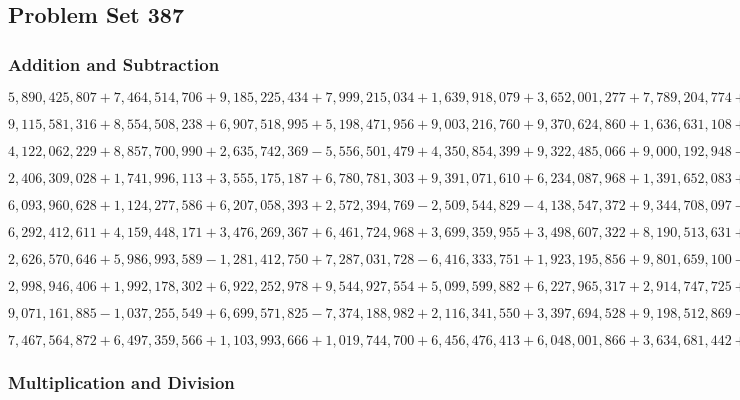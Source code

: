 \hypertarget{problem-set-387}{%
\subsection{Problem Set 387}\label{problem-set-387}}

\hypertarget{addition-and-subtraction}{%
\subsubsection{Addition and
Subtraction}\label{addition-and-subtraction}}

\(5,890,425,807+7,464,514,706+9,185,225,434+7,999,215,034+1,639,918,079+3,652,001,277+7,789,204,774+9,695,231,254+2,620,118,195+4,908,515,141\)

\(9,115,581,316+8,554,508,238+6,907,518,995+5,198,471,956+9,003,216,760+9,370,624,860+1,636,631,108+9,641,948,163+5,499,039,078+2,688,771,220\)

\(4,122,062,229+8,857,700,990+2,635,742,369-5,556,501,479+4,350,854,399+9,322,485,066+9,000,192,948-9,388,224,393 -8,062,983,947-8,305,356,834\)

\(2,406,309,028+1,741,996,113+3,555,175,187+6,780,781,303+9,391,071,610+6,234,087,968+1,391,652,083+7,830,080,796+9,226,144,130+8,742,749,566\)

\(6,093,960,628+1,124,277,586+6,207,058,393+2,572,394,769-2,509,544,829-4,138,547,372+9,344,708,097-5,394,869,096+4,791,799,950-6,793,711,068\)

\(6,292,412,611+4,159,448,171+3,476,269,367+6,461,724,968+3,699,359,955+3,498,607,322+8,190,513,631+7,003,806,438+1,498,062,871+2,874,485,378\)

\(2,626,570,646+5,986,993,589-1,281,412,750+7,287,031,728-6,416,333,751+1,923,195,856+9,801,659,100-4,299,319,586-7,025,338,873+6,664,325,830\)

\(2,998,946,406+1,992,178,302+6,922,252,978+9,544,927,554+5,099,599,882+6,227,965,317+2,914,747,725+2,492,681,261+8,435,369,210+1,552,564,041\)

\(9,071,161,885-1,037,255,549+6,699,571,825-7,374,188,982+2,116,341,550+3,397,694,528+9,198,512,869-6,107,945,775-5,821,591,817+2,177,843,205\)

\(7,467,564,872+6,497,359,566+1,103,993,666+1,019,744,700+6,456,476,413+6,048,001,866+3,634,681,442+7,088,700,117+3,657,337,745+4,749,487,354\)

\hypertarget{multiplication-and-division}{%
\subsubsection{Multiplication and
Division}\label{multiplication-and-division}}

